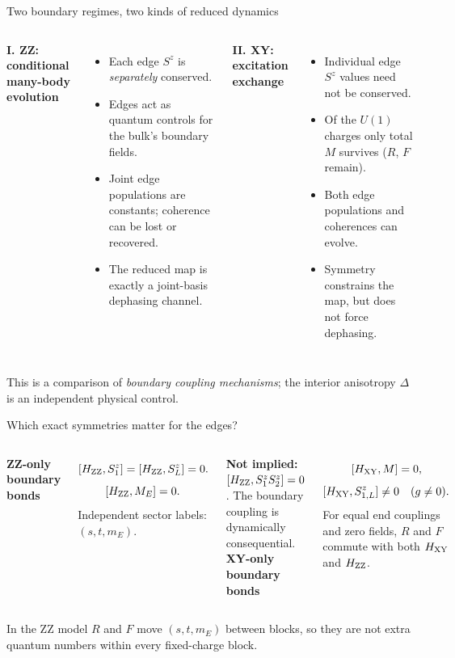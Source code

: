 \documentclass[aspectratio=169,10pt]{beamer}
\newcommand{\sechead}[1]{{\color{sea}\bfseries #1}\par\vspace{1mm}}
\newcommand{\noteinline}[1]{{\color{muted}\footnotesize #1}}
\newcommand{\smallrule}{\par\vspace{1mm}\noindent{\color{linegray}\rule{\linewidth}{0.6pt}}\par\vspace{1mm}}
\begin{document}
\begin{frame}{Two boundary regimes, two kinds of reduced dynamics}
\begin{columns}[T,onlytextwidth]
\sechead{I. ZZ: conditional many-body evolution}
\begin{itemize}\setlength\itemsep{7pt}
\item Each edge \(S^z\) is \emph{separately} conserved.
\item Edges act as quantum controls for the bulk's boundary fields.
\item Joint edge populations are constants; coherence can be lost or recovered.
\item The reduced map is exactly a joint-basis dephasing channel.
\end{itemize}
\sechead{II. XY: excitation exchange}
\begin{itemize}\setlength\itemsep{7pt}
\item Individual edge \(S^z\) values need not be conserved.
\item Of the \(U(1)\) charges only total \(M\) survives (\(R\), \(F\) remain).
\item Both edge populations and coherences can evolve.
\item Symmetry constrains the map, but does not force dephasing.
\end{itemize}
\end{columns}
\vspace{.24cm}
\noteinline{This is a comparison of \emph{boundary coupling mechanisms}; the interior anisotropy \(\Delta\) is an independent physical control.}
\end{frame}


\begin{frame}{Which exact symmetries matter for the edges?}
\begin{columns}[T,onlytextwidth]
\sechead{ZZ-only boundary bonds}
\[
[H_{\rm ZZ},S_1^z]=[H_{\rm ZZ},S_L^z]=0.
\]
\[[H_{\rm ZZ},M_E]=0.\]
\smallskip
Independent sector labels: \((s,t,m_E)\).
\par
\textbf{Not implied:} \([H_{\rm ZZ},S_1^zS_2^z]=0\). The boundary coupling is dynamically consequential.
\sechead{XY-only boundary bonds}
\[
[H_{\rm XY},M]=0,
\]
\[
[H_{\rm XY},S_{1,L}^z]\neq0\quad(g\ne0).
\]
\smallskip
For equal end couplings and zero fields, \(R\) and \(F\) commute with both \(H_{\rm XY}\) and \(H_{\rm ZZ}\).
\end{columns}
\smallrule
\noteinline{In the ZZ model \(R\) and \(F\) move \((s,t,m_E)\) between blocks, so they are not extra quantum numbers within every fixed-charge block.}
\end{frame}
\end{document}
